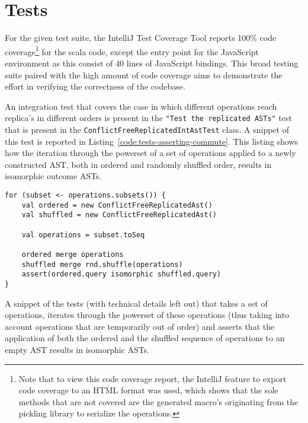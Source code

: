 \section{Tests}\label{sec:tests}


For the given test suite, the IntelliJ Test Coverage Tool reports 100\% code coverage\footnote{
    Note that to view this code coverage report, the IntelliJ feature to export code coverage to an HTML format was used,
    which shows that the sole methods that are not covered are the generated macro's originating from the pickling library
    to serialize the operations.} for the scala code, except the entry point for the JavaScript environment as this consist
of 40 lines of JavaScript bindings.
This broad testing suite paired with the high amount of code coverage aims to demonstrate the effort in verifying the
correctness of the codebase.

An integration test that covers the case in which different operations reach replica's in different orders is present in
the \texttt{"Test the replicated ASTs"} test that is present in the
\texttt{ConflictFreeReplicatedIntAstTest} class.
A snippet of this test is reported in Listing~\ref{code:tests-asserting-commute}.
This listing shows how the iteration through the powerset of a set of operations applied to a newly constructed AST,
both in ordered and randomly shuffled order, results in isomorphic outcome ASTs.

\begin{listing}
    \begin{verbatim}
for (subset <- operations.subsets()) {
    val ordered = new ConflictFreeReplicatedAst()
    val shuffled = new ConflictFreeReplicatedAst()

    val operations = subset.toSeq

    ordered merge operations
    shuffled merge rnd.shuffle(operations)
    assert(ordered.query isomorphic shuffled.query)
}
    \end{verbatim}
    \caption{
        A snippet of the tests (with technical details left out) that takes a set of operations, iterates through the
        powerset of these operations (thus taking into account operations that are temporarily out of order) and asserts
        that the application of both the ordered and the shuffled sequence of operations to an empty AST results in
        isomorphic ASTs.
    }
    \label{code:tests-asserting-commute}
\end{listing}
